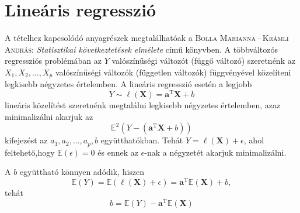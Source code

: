 \documentclass[DIV=15,appendixprefix]{scrreprt}
\theoremstyle{definition}
\theoremstyle{remark}
\newcommand{\mean}{\mathbb{E}}
\DeclareMathOperator{\T}{T}
\begin{document}
\section{Lineáris regresszió}
A tételhez kapcsolódó anyagrészek megtalálhatóak a \textsc{Bolla Marianna\,--\,Krámli András}:
\emph{Statisztikai következtetések elmélete} \cite[6.3--6.5.~szakaszok]{BollaKramli} című könyvben.
%
A többváltozós regressziós problémában az $ Y $ valószínűségi változót (függő változó) szeretnénk az
$ X_{ 1 },{} X_{ 2 },{} \ldots,{} X_{ p } $ valószínűségi változók (független változók) függvényével
közelíteni legkisebb négyzetes értelemben. A lineáris regresszió esetén a legjobb
\begin{equation*}
	Y \sim \ell \left( \mathbf{ X } \right) = \mathbf{ a }^{ \T } \mathbf{ X } + b
\end{equation*}
lineáris közelítést szeretnénk megtalálni legkisebb négyzetes értelemben, azaz minimalizálni akarjuk
az
\begin{equation*}
	\mean^{ 2 } \left( Y - \left( \mathbf{ a }^{ \T } \mathbf{ X } + b  \right) \right)
\end{equation*}
kifejezést az $ a_{ 1 },{} a_{ 2 },{} \ldots,{} a_{ p },{} b $ együtthatókban. Tehát $ Y = \ell
\left( \mathbf{ X } \right) + \epsilon $, ahol feltehető,hogy $ \mean \left(
\epsilon \right) = 0 $ és ennek az $ \epsilon $-nak a négyzetét akarjuk minimalizálni.

A $ b $ együttható könnyen adódik, hiszen
\begin{equation*}
	\mean \left( Y \right) = \mean \left( \ell \left( \mathbf{ X } \right) + \epsilon \right) =
	\mathbf{ a }^{ \T } \mean \left( \mathbf{ X } \right) + b,
\end{equation*}
tehát
\begin{equation*}
	b = \mean \left( Y \right) - \mathbf{ a }^{ \T } \mean \left( \mathbf{ X } \right)
\end{equation*}
\end{document}
